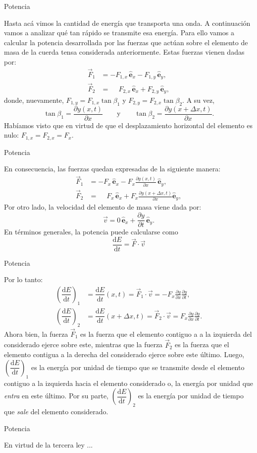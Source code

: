 \documentclass[11pt,handout,aspectratio=1610]{beamer}
\newcommand{\fdiff}[2]{\dfrac{\text{d} #1}{\text{d} #2}}
\newcommand{\pdiff}[2]{\frac{\partial #1}{\partial #2}}
\newcommand{\ver}[1]{\hat{\mathbf{#1}}}
\begin{document}
\begin{frame}{Potencia}

    Hasta acá vimos la cantidad de energía que transporta una onda. A continuación vamos a analizar qué tan rápido se transmite esa energía. Para ello vamos a calcular la potencia desarrollada por las fuerzas que actúan sobre el elemento de masa de la cuerda tensa considerada anteriormente. Estas fuerzas vienen dadas por:
    \begin{align*}
        \vec{F}_1 &= - F_{1,x} \, \ver{e}_x - F_{1,y} \, \ver{e}_y, \\
        \vec{F}_2 &= \phantom{-}F_{2,x} \, \ver{e}_x + F_{2,y}\, \ver{e}_y,
    \end{align*} donde, nuevamente, $F_{1,y} = F_{1,x} \tan \beta_1$ y $F_{2,y} = F_{2,x} \tan \beta_2$. A su vez, $$ \tan \beta_1 = \pdiff{y \left(x,t\right)}{x}  \qquad \text{y} \qquad \tan \beta_2 = \pdiff{y \left(x+\Delta x,t\right)}{x}.$$ Habíamos visto que en virtud de que el desplazamiento horizontal del elemento es nulo: $F_{1,x} = F_{2,x} = F_x $.
    
\end{frame}

\begin{frame}{Potencia}

    En consecuencia, las fuerzas quedan expresadas de la siguiente manera:
    \begin{align*}
        \vec{F}_1 &= - F_{x} \, \ver{e}_x - F_{x} \pdiff{y \left(x,t\right)}{x} \, \ver{e}_y, \\
        \vec{F}_2 &= \phantom{-}F_{x} \, \ver{e}_x + F_{x} \pdiff{y \left(x+\Delta x,t\right)}{x} \ver{e}_y,
    \end{align*} Por otro lado, la velocidad del elemento de masa viene dada por: $$ \vec{v} = 0 \, \ver{e}_x + \pdiff{y}{t} \, \ver{e}_y. $$ En términos generales, la potencia puede calcularse como $$\fdiff{E}{t} = \vec{F} \cdot \vec{v} $$
    
\end{frame}

\begin{frame}{Potencia}

    Por lo tanto:
    \begin{align*}
        \left(\fdiff{E}{t}\right)_1 &= \fdiff{E}{t} \left(x,t\right) = \vec{F}_1 \cdot \vec{v} = - F_{x} \pdiff{y}{x} \pdiff{y}{t},\\
        \left(\fdiff{E}{t}\right)_2 &= \fdiff{E}{t} \left(x+\Delta x,t\right) = \vec{F}_2 \cdot \vec{v} = F_{x} \pdiff{y}{x} \pdiff{y}{t}.
    \end{align*} Ahora bien, la fuerza $\vec{F}_1$ es la fuerza que el elemento contiguo a a la izquierda del considerado ejerce sobre este, mientras que la fuerza $\vec{F}_2$ es la fuerza que el elemento contigua a la derecha del considerado ejerce sobre este último. Luego, $\left(\fdiff{E}{t}\right)_1$ es la energía por unidad de tiempo que se transmite desde el elemento contiguo a la izquierda hacia el elemento considerado o, la energía por unidad que \emph{entra} en este último. Por su parte, $\left(\fdiff{E}{t}\right)_2$ es la energía por unidad de tiempo que \emph{sale} del elemento considerado.
    
\end{frame}

\begin{frame}{Potencia}

    En virtud de la tercera ley ...

\end{frame}
\end{document}
